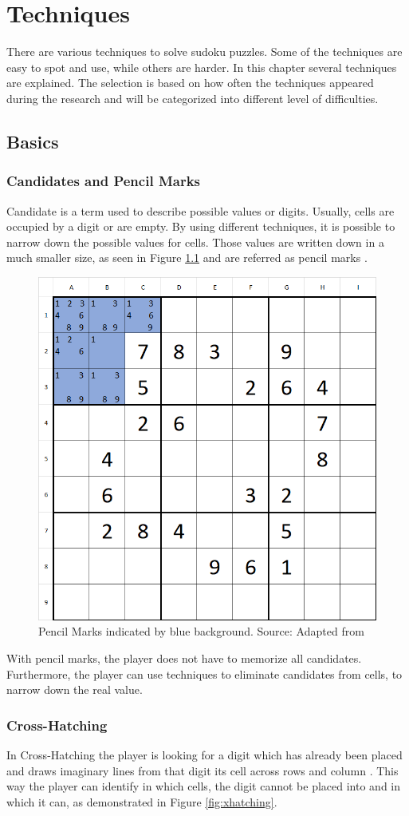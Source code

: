 \documentclass[twoside]{ausarbeitung}
\begin{document}
\chapter{Techniques}

There are various techniques to solve sudoku puzzles. Some of the techniques are easy to spot and use, while others are harder. 
In this chapter several techniques are explained. The selection is based on how often the techniques appeared during the research and will be categorized into different level of difficulties.


\section{Basics}
\subsection{Candidates and Pencil Marks}
Candidate is a term used to describe possible values or digits. Usually, cells are occupied by a digit or are empty. By using different techniques, it is possible to narrow down the possible values for cells. Those values are written down in a much smaller size, as seen in Figure \ref{fig:pmarks} and are referred as pencil marks \cite{Diagrams86:online}.

\begin{figure}[H]
  \centering
  \includegraphics[width=.475\linewidth]{images/pmarks.png}
  \caption[Pencil Marks]{Pencil Marks indicated by blue background. Source: Adapted from \cite{SolvingS57:online}}
  \label{fig:pmarks}
\end{figure}%

With pencil marks, the player does not have to memorize all candidates. Furthermore, the player can use techniques to eliminate candidates from cells, to narrow down the real value.

\subsection{Cross-Hatching} \label{ss:xhatching}
In Cross-Hatching the player is looking for a digit which has already been placed and draws imaginary lines from that digit its cell across rows and column \cite{HowtoSol27:online}. This way the player can identify in which cells, the digit cannot be placed into and in which it can, as demonstrated in Figure \ref{fig:xhatching}.
\end{document}
